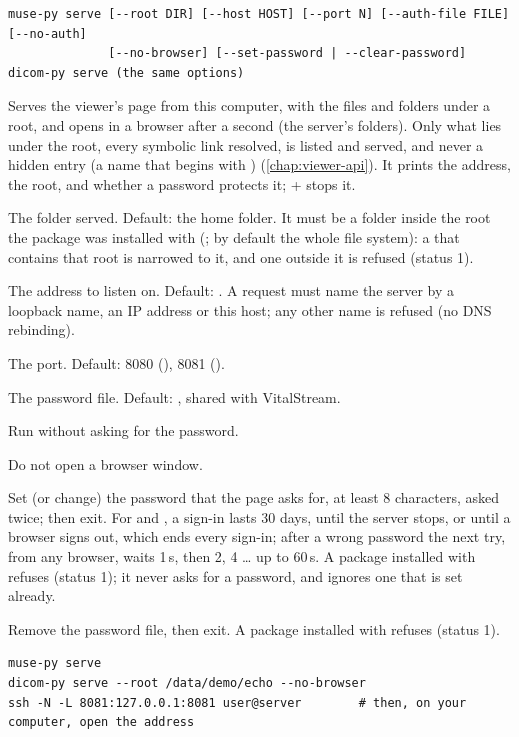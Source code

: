 \begin{lstlisting}[style=signature]
muse-py serve [--root DIR] [--host HOST] [--port N] [--auth-file FILE] [--no-auth]
              [--no-browser] [--set-password | --clear-password]
dicom-py serve (the same options)
\end{lstlisting}
Serves the viewer's page from this computer, with the files and folders under a root, and opens
 in a browser after a second (the server's folders). Only what lies
under the root, every symbolic link resolved, is listed and served, and never a hidden entry (a
name that begins with ) (\cref{chap:viewer-api}). It
prints the address, the root, and whether a password protects it; + stops it.
\begin{params}
\item[--root DIR] The folder served. Default: the home folder. It must be a folder inside the
  root the package was installed with (; by default the whole file system): a
   that contains that root is narrowed to it, and one outside it is refused (status 1).
\item[--host HOST] The address to listen on. Default: . A request must name the
  server by a loopback name, an IP address or this host; any other name is refused (no DNS
  rebinding).
\item[--port N] The port. Default: 8080 (), 8081 ().
\item[--auth-file FILE] The password file. Default:
  , shared with VitalStream.
\item[--no-auth] Run without asking for the password.
\item[--no-browser] Do not open a browser window.
\item[--set-password] Set (or change) the password that the page asks for, at least 8
  characters, asked twice; then exit. For  and , a
  sign-in lasts 30 days, until the server stops, or until a browser signs out, which ends every
  sign-in; after a wrong password the next try, from any browser, waits 1\,s, then 2, 4 \dots{}
  up to 60\,s. A package installed with
   refuses (status 1); it never asks for a password, and ignores one
  that is set already.
\item[--clear-password] Remove the password file, then exit. A package installed with
   refuses (status 1).
\end{params}
\begin{lstlisting}[style=shell]
muse-py serve
dicom-py serve --root /data/demo/echo --no-browser
ssh -N -L 8081:127.0.0.1:8081 user@server        # then, on your computer, open the address
\end{lstlisting}

